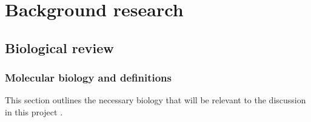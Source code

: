 \documentclass[12pt, twoside, a4paper]{article}
\begin{document}
\section{Background research}






\subsection{Biological review}
\subsubsection{Molecular biology and definitions} \label{bg:bio}
This section outlines the necessary biology that will be relevant to the discussion in this project \cite{RefWorks:106, RefWorks:108, RefWorks:110, RefWorks:111}.
\end{document}
